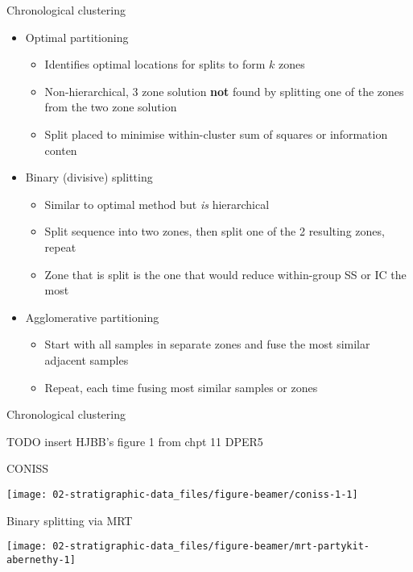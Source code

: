 \documentclass[10pt,ignorenonframetext,compress, aspectratio=169]{beamer}
\providecommand{\tightlist}{%
  \setlength{\itemsep}{0pt}\setlength{\parskip}{0pt}}
\begin{document}
\begin{frame}{Chronological clustering}

\begin{itemize}
\tightlist
\item
  Optimal partitioning

  \begin{itemize}
  \tightlist
  \item
    Identifies optimal locations for splits to form \(k\) zones
  \item
    Non-hierarchical, 3 zone solution \textbf{not} found by splitting
    one of the zones from the two zone solution
  \item
    Split placed to minimise within-cluster sum of squares or
    information conten
  \end{itemize}
\item
  Binary (divisive) splitting

  \begin{itemize}
  \tightlist
  \item
    Similar to optimal method but \textit{is} hierarchical
  \item
    Split sequence into two zones, then split one of the 2 resulting
    zones, repeat
  \item
    Zone that is split is the one that would reduce within-group SS or
    IC the most
  \end{itemize}
\item
  Agglomerative partitioning

  \begin{itemize}
  \tightlist
  \item
    Start with all samples in separate zones and fuse the most similar
    adjacent samples
  \item
    Repeat, each time fusing most similar samples or zones
  \end{itemize}
\end{itemize}

\end{frame}

\begin{frame}{Chronological clustering}

TODO insert HJBB's figure 1 from chpt 11 DPER5

\end{frame}

\begin{frame}{CONISS}

\begin{center}\texttt{[image: 02-stratigraphic-data\_files/figure-beamer/coniss-1-1]} \end{center}

\end{frame}

\begin{frame}{Binary splitting via MRT}

\begin{center}\texttt{[image: 02-stratigraphic-data\_files/figure-beamer/mrt-partykit-abernethy-1]} \end{center}

\end{frame}
\end{document}
